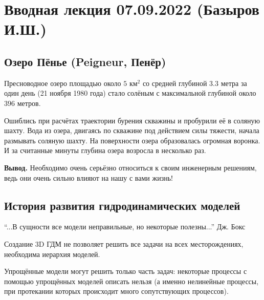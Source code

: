 \documentclass[main.tex]{subfiles}
\begin{document}

\section{Вводная лекция 07.09.2022 (Базыров И.Ш.)}

\subsection{Озеро Пёнье (Peigneur, Пенёр)}

Пресноводное озеро площадью около $5\text{ км}^2$ со средней глубиной $3.3$ метра за один день (21 ноября 1980 года) стало солёным с максимальной глубиной около $396$ метров.

Ошиблись при расчётах траектории бурения скважины и пробурили её в соляную шахту. 
Вода из озера, двигаясь по скважине под действием силы тяжести, начала размывать соляную шахту.
На поверхности озера образовалась огромная воронка. И за считанные минуты глубина озера возросла в несколько раз.

\textbf{Вывод.} Необходимо очень серьёзно относиться к своим инженерным решениям, ведь они очень сильно влияют на нашу с вами жизнь!

\subsection{История развития гидродинамических моделей}

\enquote{...В сущности все модели неправильные, но некоторые полезны...} Дж. Бокс

Создание 3D ГДМ не позволяет решить все задачи на всех месторождениях, необходима иерархия моделей.

Упрощённые модели могут решить только часть задач: некоторые процессы с помощью упрощённых моделей описать нельзя (а именно нелинейные процессы, при протекании которых происходит много сопутствующих процессов).
\end{document}
